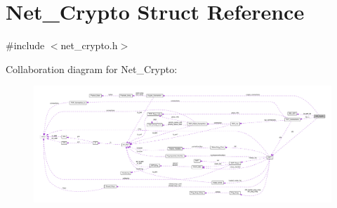 \hypertarget{struct_net___crypto}{\section{Net\+\_\+\+Crypto Struct Reference}
\label{struct_net___crypto}
}


{\ttfamily \#include $<$net\+\_\+crypto.\+h$>$}



Collaboration diagram for Net\+\_\+\+Crypto\+:
\nopagebreak
\begin{figure}[H]
\begin{center}
\leavevmode
\includegraphics[width=350pt]{d3/d77/struct_net___crypto__coll__graph}
\end{center}
\end{figure}
